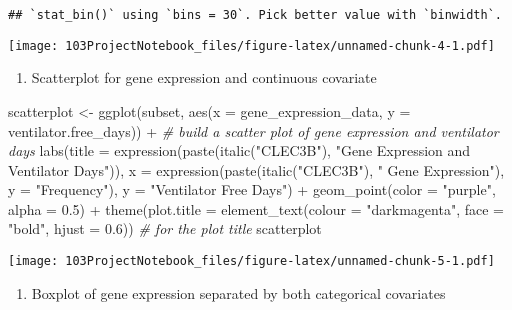 \documentclass[
]{article}
\newenvironment{Shaded}{\begin{snugshade}}{\end{snugshade}}
\newcommand{\AttributeTok}[1]{\textcolor[rgb]{0.77,0.63,0.00}{#1}}
\newcommand{\CommentTok}[1]{\textcolor[rgb]{0.56,0.35,0.01}{\textit{#1}}}
\newcommand{\FloatTok}[1]{\textcolor[rgb]{0.00,0.00,0.81}{#1}}
\newcommand{\FunctionTok}[1]{\textcolor[rgb]{0.00,0.00,0.00}{#1}}
\newcommand{\NormalTok}[1]{#1}
\newcommand{\OtherTok}[1]{\textcolor[rgb]{0.56,0.35,0.01}{#1}}
\newcommand{\SpecialCharTok}[1]{\textcolor[rgb]{0.00,0.00,0.00}{#1}}
\newcommand{\StringTok}[1]{\textcolor[rgb]{0.31,0.60,0.02}{#1}}
\providecommand{\tightlist}{%
  \setlength{\itemsep}{0pt}\setlength{\parskip}{0pt}}
\begin{document}
\begin{verbatim}
## `stat_bin()` using `bins = 30`. Pick better value with `binwidth`.
\end{verbatim}

\texttt{[image: 103ProjectNotebook\_files/figure-latex/unnamed-chunk-4-1.pdf]}

\begin{enumerate}
\def\labelenumi{(\alph{enumi})}
\setcounter{enumi}{1}
\tightlist
\item
  Scatterplot for gene expression and continuous covariate
\end{enumerate}

\begin{Shaded}
\begin{Highlighting}[]
\NormalTok{scatterplot }\OtherTok{\textless{}{-}} \FunctionTok{ggplot}\NormalTok{(subset, }\FunctionTok{aes}\NormalTok{(}\AttributeTok{x =}\NormalTok{ gene\_expression\_data, }\AttributeTok{y =}\NormalTok{ ventilator.free\_days)) }\SpecialCharTok{+}  \CommentTok{\# build a scatter plot of gene expression and ventilator days}
  \FunctionTok{labs}\NormalTok{(}\AttributeTok{title =} \FunctionTok{expression}\NormalTok{(}\FunctionTok{paste}\NormalTok{(}\FunctionTok{italic}\NormalTok{(}\StringTok{"CLEC3B"}\NormalTok{), }\StringTok{"Gene Expression and Ventilator Days"}\NormalTok{)), }\AttributeTok{x =} \FunctionTok{expression}\NormalTok{(}\FunctionTok{paste}\NormalTok{(}\FunctionTok{italic}\NormalTok{(}\StringTok{"CLEC3B"}\NormalTok{), }\StringTok{" Gene Expression"}\NormalTok{), }\AttributeTok{y =} \StringTok{"Frequency"}\NormalTok{), }\AttributeTok{y =} \StringTok{"Ventilator Free Days"}\NormalTok{) }\SpecialCharTok{+}
  \FunctionTok{geom\_point}\NormalTok{(}\AttributeTok{color =} \StringTok{"purple"}\NormalTok{, }\AttributeTok{alpha =} \FloatTok{0.5}\NormalTok{) }\SpecialCharTok{+}
  \FunctionTok{theme}\NormalTok{(}\AttributeTok{plot.title =} \FunctionTok{element\_text}\NormalTok{(}\AttributeTok{colour =} \StringTok{"darkmagenta"}\NormalTok{, }\AttributeTok{face =} \StringTok{"bold"}\NormalTok{, }\AttributeTok{hjust =} \FloatTok{0.6}\NormalTok{)) }\CommentTok{\# for the plot title}
\NormalTok{scatterplot}
\end{Highlighting}
\end{Shaded}

\texttt{[image: 103ProjectNotebook\_files/figure-latex/unnamed-chunk-5-1.pdf]}

\begin{enumerate}
\def\labelenumi{(\alph{enumi})}
\setcounter{enumi}{2}
\tightlist
\item
  Boxplot of gene expression separated by both categorical covariates
\end{enumerate}
\end{document}
